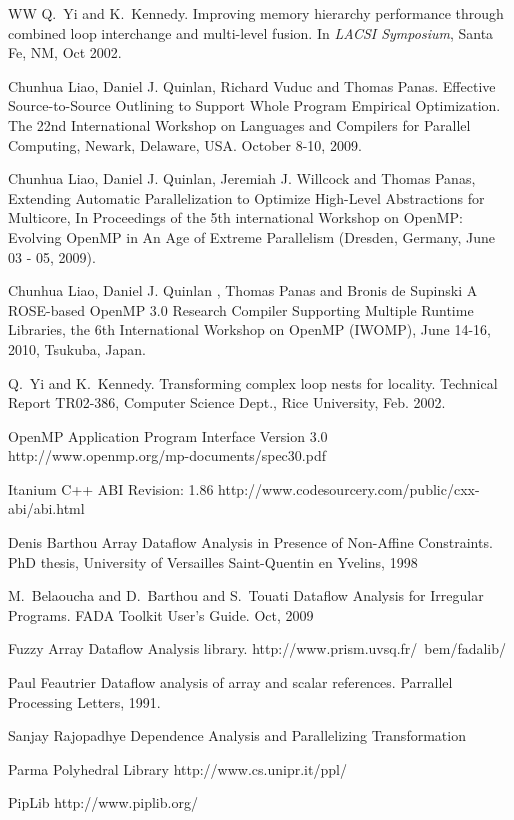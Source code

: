 \begin{thebibliography}{WW}
Q.~Yi and K.~Kennedy.
\newblock Improving memory hierarchy performance through combined loop
  interchange and multi-level fusion.
\newblock In {\em LACSI Symposium}, Santa Fe, NM, Oct 2002.

Chunhua Liao, Daniel J. Quinlan, Richard Vuduc and Thomas Panas.
\newblock Effective Source-to-Source Outlining to Support Whole Program
Empirical Optimization.
\newblock The 22nd International Workshop on Languages and Compilers for Parallel Computing, Newark, Delaware, USA. October 8-10, 2009.

Chunhua Liao, Daniel J. Quinlan, Jeremiah J. Willcock and Thomas Panas,
\newblock Extending Automatic Parallelization to Optimize High-Level
Abstractions for Multicore,
\newblock In Proceedings of the 5th international Workshop on OpenMP:
Evolving OpenMP in An Age of Extreme Parallelism (Dresden, Germany, June 03
- 05, 2009).

Chunhua Liao, Daniel J. Quinlan , Thomas Panas and Bronis de Supinski
\newblock A ROSE-based OpenMP 3.0 Research Compiler Supporting Multiple
Runtime Libraries,
\newblock the 6th International Workshop on OpenMP (IWOMP), June 14-16,
2010, Tsukuba, Japan.




Q.~Yi and K.~Kennedy.
\newblock Transforming complex loop nests for locality.
\newblock Technical Report TR02-386, Computer Science Dept., Rice University,
  Feb. 2002.

\newblock OpenMP Application Program Interface Version 3.0
\newblock http://www.openmp.org/mp-documents/spec30.pdf

\newblock Itanium C++ ABI Revision: 1.86
\newblock http://www.codesourcery.com/public/cxx-abi/abi.html

Denis Barthou
\newblock Array Dataflow Analysis in Presence of Non-Affine Constraints.
\newblock PhD thesis, University of Versailles Saint-Quentin en Yvelins, 1998

M.~Belaoucha and D.~Barthou and S.~Touati
\newblock Dataflow Analysis for Irregular Programs. FADA Toolkit User's Guide. Oct, 2009

Fuzzy Array Dataflow Analysis library.
\newblock http://www.prism.uvsq.fr/~bem/fadalib/

Paul Feautrier
\newblock Dataflow analysis of array and scalar references.
\newblock Parrallel Processing Letters, 1991.

Sanjay Rajopadhye
\newblock Dependence Analysis and Parallelizing Transformation

Parma Polyhedral Library
\newblock http://www.cs.unipr.it/ppl/

PipLib
\newblock http://www.piplib.org/

\end{thebibliography}




